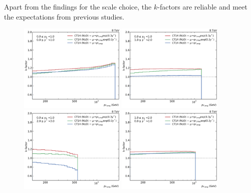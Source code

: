 Apart from the findings for the \ptavg scale choice, the $k$-factors are
reliable and meet the expectations from previous studies.

\begin{figure}[htp]
    \centering
    \includegraphics[width=0.45\textwidth]{figures/theory/kfactor_comp_yb0ys0.pdf}\hfill
    \includegraphics[width=0.45\textwidth]{figures/theory/kfactor_comp_yb0ys1.pdf}
    \includegraphics[width=0.45\textwidth]{figures/theory/kfactor_comp_yb0ys2.pdf}\hfill
    \includegraphics[width=0.45\textwidth]{figures/theory/kfactor_comp_yb1ys0.pdf}

\end{figure}
